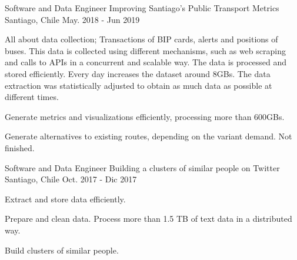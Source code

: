 

\begin{cventries}

  \cventry
    {Software and Data Engineer} %
    {Improving Santiago's Public Transport Metrics} %
    {Santiago, Chile} %
    {May. 2018 - Jun 2019} %
    {
      \begin{cvitems} %
        \item {All about data collection; Transactions of BIP cards, alerts and positions of buses. This data is collected using different mechanisms, such as web scraping and calls to APIs in a concurrent and scalable way. The data is processed and stored efficiently. Every day increases the dataset around 8GBs. The data extraction was statistically adjusted to obtain as much data as possible at different times.}
        \item {Generate metrics and visualizations efficiently, processing more than 600GBs.}
	    \item {Generate alternatives to existing routes, depending on the variant demand. Not finished.}
      \end{cvitems}
    }

  \cventry
    {Software and Data Engineer} %
    {Building a clusters of similar people on Twitter} %
    {Santiago, Chile} %
    {Oct. 2017 - Dic 2017} %
    {
      \begin{cvitems} %
		\item {Extract and store data efficiently.}
        \item {Prepare and clean data. Process more than 1.5 TB of text data in a distributed way.}
        \item {Build clusters of similar people.}
      \end{cvitems}
    }
\end{cventries}
